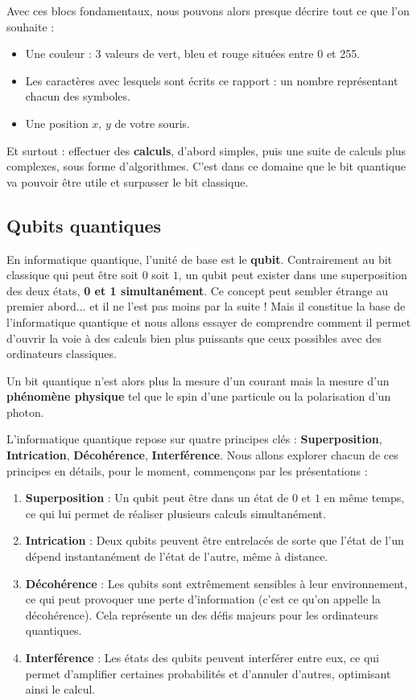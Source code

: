 \documentclass{article}
\begin{document}
Avec ces blocs fondamentaux, nous pouvons alors presque décrire tout ce que l’on souhaite :
\medskip
\begin{itemize}
    \item Une couleur : 3 valeurs de vert, bleu et rouge situées entre 0 et 255.
    \item Les caractères avec lesquels sont écrits ce rapport : un nombre représentant chacun des symboles.
    \item Une position $x$, $y$ de votre souris.
\end{itemize}
\medskip
Et surtout : effectuer des \textbf{calculs}, d’abord simples, puis une suite de calculs plus complexes, sous forme d’algorithmes. C’est dans ce domaine que le bit quantique va pouvoir être utile et surpasser le bit classique.

\subsection{Qubits quantiques}

En informatique quantique, l’unité de base est le \textbf{qubit}. Contrairement au bit classique qui peut être soit $0$ soit $1$, un qubit peut exister dans une superposition des deux états, \textbf{0 et 1 simultanément}. \cite{wikiQubit2025} Ce concept peut sembler étrange au premier abord... et il ne l’est pas moins par la suite ! Mais il constitue la base de l'informatique quantique et nous allons essayer de comprendre comment il permet d'ouvrir la voie à des calculs bien plus puissants que ceux possibles avec des ordinateurs classiques.

Un bit quantique n’est alors plus la mesure d’un courant mais la mesure d’un \textbf{phénomène physique} tel que le spin d'une particule ou la polarisation d'un photon.

L’informatique quantique repose sur quatre principes clés : \textbf{Superposition}, \textbf{Intrication}, \textbf{Décohérence}, \textbf{Interférence}. \cite{ibmQuantum2024}
\medskip
Nous allons explorer chacun de ces principes en détails, pour le moment, commençons par les présentations :

\begin{enumerate}
    \item \textbf{Superposition} : Un qubit peut être dans un état de $0$ et $1$ en même temps, ce qui lui permet de réaliser plusieurs calculs simultanément.
    \item \textbf{Intrication} : Deux qubits peuvent être entrelacés de sorte que l'état de l'un dépend instantanément de l'état de l'autre, même à distance.
    \item \textbf{Décohérence} : Les qubits sont extrêmement sensibles à leur environnement, ce qui peut provoquer une perte d'information (c'est ce qu'on appelle la décohérence). Cela représente un des défis majeurs pour les ordinateurs quantiques.
    \item \textbf{Interférence} : Les états des qubits peuvent interférer entre eux, ce qui permet d’amplifier certaines probabilités et d’annuler d'autres, optimisant ainsi le calcul.
\end{enumerate}
\medskip
\end{document}

